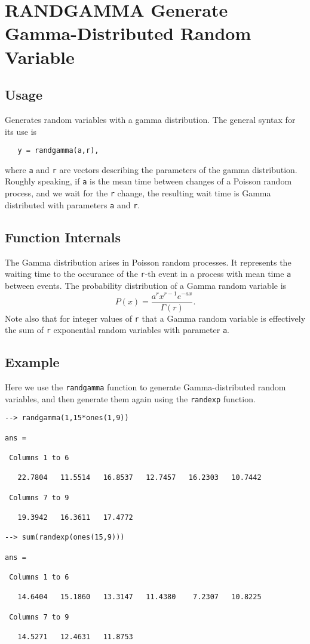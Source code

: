\section{RANDGAMMA Generate Gamma-Distributed Random Variable}

\subsection{Usage}

Generates random variables with a gamma distribution.  The general
syntax for its use is
\begin{verbatim}
   y = randgamma(a,r),
\end{verbatim}
where \verb|a| and \verb|r| are vectors describing the parameters of the
gamma distribution.  Roughly speaking, if \verb|a| is the mean time between
changes of a Poisson random process, and we wait for the \verb|r| change,
the resulting wait time is Gamma distributed with parameters \verb|a| 
and \verb|r|.
\subsection{Function Internals}

The Gamma distribution arises in Poisson random processes.  It represents
the waiting time to the occurance of the \verb|r|-th event in a process with
mean time \verb|a| between events.  The probability distribution of a Gamma
random variable is
\[
   P(x) = \frac{a^r x^{r-1} e^{-ax}}{\Gamma(r)}.
\]
Note also that for integer values of \verb|r| that a Gamma random variable
is effectively the sum of \verb|r| exponential random variables with parameter
\verb|a|.
\subsection{Example}

Here we use the \verb|randgamma| function to generate Gamma-distributed
random variables, and then generate them again using the \verb|randexp|
function.
\begin{verbatim}
--> randgamma(1,15*ones(1,9))

ans = 

 Columns 1 to 6

   22.7804   11.5514   16.8537   12.7457   16.2303   10.7442 

 Columns 7 to 9

   19.3942   16.3611   17.4772 

--> sum(randexp(ones(15,9)))

ans = 

 Columns 1 to 6

   14.6404   15.1860   13.3147   11.4380    7.2307   10.8225 

 Columns 7 to 9

   14.5271   12.4631   11.8753 
\end{verbatim}
